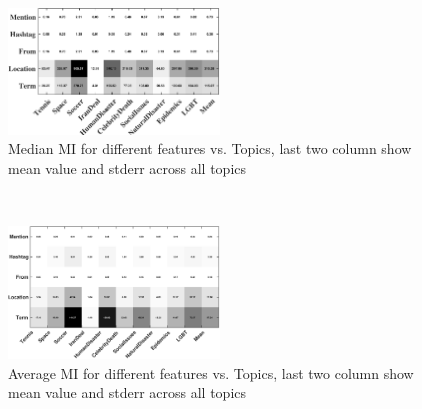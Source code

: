 \begin{figure}[h!]
\centering
\includegraphics[width=0.5\textwidth]{images/medianMI.pdf}
\vspace{-3mm}
\caption{Median MI for different features vs. Topics, last two column show mean value and stderr across all topics}
\label{fig:medianMI}
\end{figure}
\
\begin{figure}[h!]
\centering
\includegraphics[width=0.5\textwidth]{images/avgMI_gray.pdf}
\vspace{-3mm}
\caption{Average MI for different features vs. Topics, last two column show mean value and stderr across all topics}
\label{fig:avgMI}
\end{figure}

